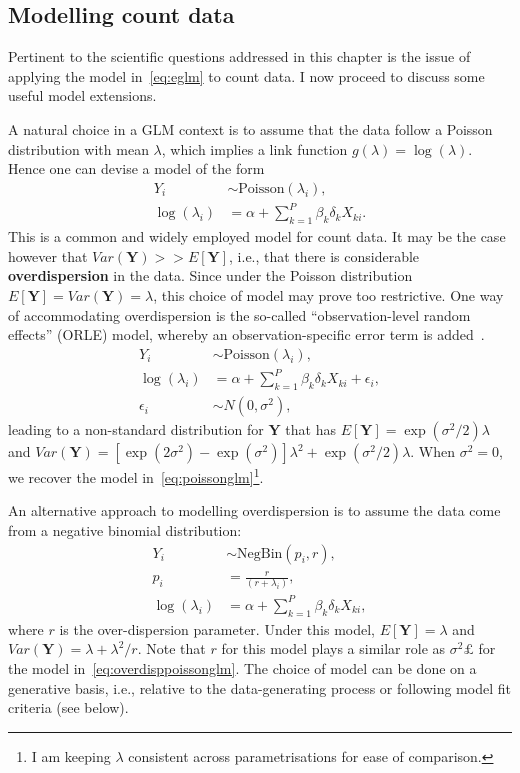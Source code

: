 \subsection{Modelling count data}
\label{sec:countmodelling}

Pertinent to the scientific questions addressed in this chapter is the issue of applying the model in~\ref{eq:eglm} to count data.
I now proceed to discuss some useful model extensions.

A natural choice in a GLM context is to assume that the data follow a Poisson distribution with mean $\lambda$, which implies a link function $g(\lambda) = \log(\lambda)$.
Hence one can devise a model of the form
\begin{align}
 \label{eq:poissonglm}
   Y_i &\sim \text{Poisson}(\lambda_i), \\
  \log(\lambda_i) &= \alpha + \sum_{k=1}^P \beta_k\delta_k X_{ki}.
\end{align}
This is a common and widely employed model for count data.
It may be the case however that $Var(\boldsymbol Y) >> E[\boldsymbol Y]$, i.e., that there is considerable \textbf{overdispersion} in the data.
Since under the Poisson distribution $ E[\boldsymbol Y] = Var(\boldsymbol Y) = \lambda$, this choice of model may prove too restrictive.
One way of accommodating overdispersion is the so-called ``observation-level random effects'' (ORLE) model, whereby an observation-specific error term is added~\citep{Hinde1982,Hill2007,Harrison2014}.
\begin{align}
 \label{eq:overdisppoissonglm}
   Y_i &\sim \text{Poisson}(\lambda_i), \\
  \log(\lambda_i) &= \alpha + \sum_{k=1}^P \beta_k\delta_k X_{ki} + \epsilon_i, \\
  \epsilon_i &\sim N(0, \sigma^2),
\end{align}
leading to a non-standard distribution for $\boldsymbol Y$ that has $E[\boldsymbol Y] =  \exp(\sigma^2/2)\lambda$ and $Var(\boldsymbol Y) = [\exp(2\sigma^2) - \exp(\sigma^2)] \lambda^2 + \exp(\sigma^2/2)\lambda$.
When $\sigma^2 = 0 $, we recover the model in~\ref{eq:poissonglm}\footnote{I am keeping $\lambda$ consistent across parametrisations for ease of comparison.}.

An alternative approach to modelling overdispersion is to assume the data come from a negative binomial distribution:
\begin{align}
\label{eq:negbinglm}
 Y_i & \sim \text{NegBin}(p_i, r), \\
 p_i & = \frac{r}{(r + \lambda_i)},  \\ 
  \log(\lambda_i) &= \alpha + \sum_{k=1}^P \beta_k\delta_k X_{ki},
\end{align}
where $r$ is the over-dispersion parameter.
Under this model, $E[\boldsymbol Y] = \lambda$ and $Var(\boldsymbol Y) =  \lambda + \lambda^2/r$.
Note that $r$ for this model plays a similar role as $\sigma^2£$ for the model in~\ref{eq:overdisppoissonglm}.
The choice of model can be done on a generative basis, i.e., relative to the data-generating process or following model fit criteria (see below).

